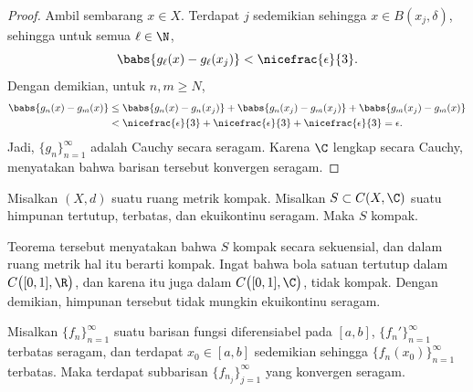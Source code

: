 \begin{proof}
Ambil sembarang $x \in X$.  Terdapat $j$ sedemikian sehingga
$x \in B(x_j,\delta)$, sehingga untuk semua $\ell \in \N$,
\begin{equation*}
\babs{g_\ell(x)-g_\ell(x_j)} < \nicefrac{\epsilon}{3}.
\end{equation*}
Dengan demikian, untuk $n,m \geq N$,
\begin{equation*}
\begin{split}
\babs{g_n(x)-g_m(x)} & \leq
\babs{g_n(x)-g_n(x_j)} +
\babs{g_n(x_j)-g_m(x_j)} +
\babs{g_m(x_j)-g_m(x)}
\\
& <
\nicefrac{\epsilon}{3} +
\nicefrac{\epsilon}{3} +
\nicefrac{\epsilon}{3} = \epsilon .
\end{split}
\end{equation*}
Jadi, $\{ g_n \}_{n=1}^\infty$ adalah Cauchy secara seragam.  Karena $\C$
lengkap secara Cauchy,  menyatakan bahwa barisan tersebut konvergen seragam.
\end{proof}

\begin{cor}
Misalkan $(X,d)$ suatu ruang metrik kompak.
Misalkan $S \subset C(X,\C)$ suatu himpunan tertutup, terbatas, dan ekuikontinu seragam.
Maka $S$ kompak.
\end{cor}

Teorema tersebut menyatakan bahwa $S$
kompak secara sekuensial, dan dalam ruang metrik hal itu berarti
kompak.
Ingat bahwa bola satuan tertutup dalam $C\bigl([0,1],\R\bigr)$, dan karena itu juga dalam
$C\bigl([0,1],\C\bigr)$, tidak kompak.
Dengan demikian, himpunan tersebut tidak mungkin ekuikontinu seragam.

\begin{cor}
Misalkan $\{ f_n \}_{n=1}^\infty$ suatu barisan fungsi diferensiabel pada $[a,b]$,
$\{ f_n' \}_{n=1}^\infty$ terbatas seragam, dan terdapat
$x_0 \in [a,b]$ sedemikian sehingga $\{ f_n(x_0) \}_{n=1}^\infty$ terbatas.
Maka terdapat subbarisan
$\{ f_{n_j} \}_{j=1}^\infty$ yang konvergen seragam.
\end{cor}

